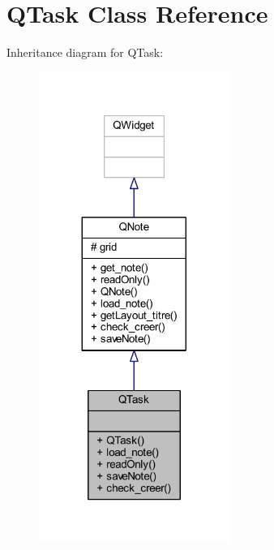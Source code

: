\hypertarget{class_q_task}{}\section{Q\+Task Class Reference}
\label{class_q_task}


Inheritance diagram for Q\+Task\+:
\nopagebreak
\begin{figure}[H]
\begin{center}
\leavevmode
\includegraphics[width=176pt]{class_q_task__inherit__graph}
\end{center}
\end{figure}


